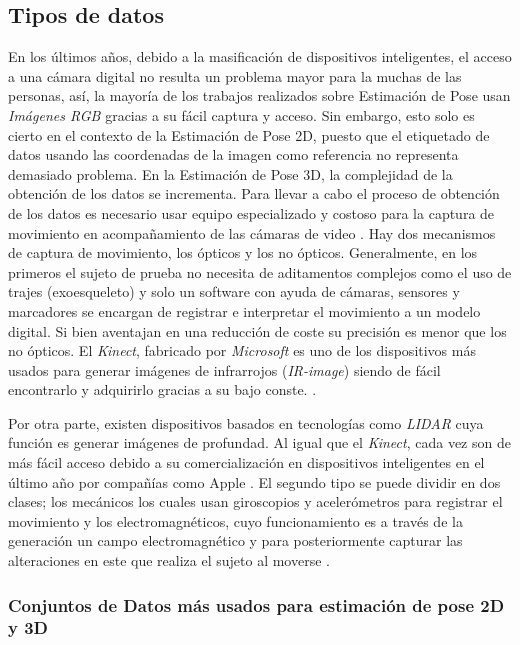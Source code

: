 \subsection{Tipos de datos}

En los últimos años, debido a la masificación
de dispositivos inteligentes, el acceso a una cámara digital no resulta un problema mayor para la muchas
de las personas, así, la mayoría de los trabajos realizados sobre Estimación de Pose usan
\textit{Imágenes RGB} gracias a su fácil captura y acceso.
Sin embargo, esto solo es cierto en el contexto de la Estimación de Pose 2D, puesto que el etiquetado de datos
usando las coordenadas de la imagen como referencia no representa demasiado problema. En la
Estimación de Pose 3D, la complejidad de la obtención de los datos se incrementa. Para llevar a cabo
el proceso de obtención de los datos es necesario usar equipo especializado y costoso para la captura
de movimiento en acompañamiento de las cámaras de video \cite{6682899}. Hay dos mecanismos de captura
de movimiento, los ópticos y los no ópticos. Generalmente, en los primeros el sujeto de prueba no
necesita de aditamentos complejos como el uso de trajes
(exoesqueleto) y solo un software con ayuda de cámaras, sensores y marcadores se
encargan de registrar e interpretar el movimiento a un modelo digital. Si bien
aventajan en una reducción de coste su precisión es menor que los no ópticos.
El \textit{Kinect}, fabricado por \textit{Microsoft} es uno de los dispositivos más usados
para generar imágenes de infrarrojos (\textit{IR-image}) siendo de fácil encontrarlo y adquirirlo
gracias a su bajo conste. \cite{6165146} \cite{Izadi11kinectfusion:real-time}.

Por otra parte, existen dispositivos basados en tecnologías como \textit{LIDAR} cuya función es
generar imágenes de profundad. Al igual que el \textit{Kinect}, cada vez son de más fácil acceso
debido a su comercialización en dispositivos inteligentes en el último año por compañías como Apple
\cite{DBLP:journals/corr/abs-1711-06396}. El segundo tipo se puede dividir en dos clases;
los mecánicos los cuales usan giroscopios y acelerómetros para registrar el
movimiento y los electromagnéticos, cuyo funcionamiento es a través de la generación un campo
electromagnético y para posteriormente capturar las alteraciones en este que realiza el sujeto al
moverse \cite{articleMotion}.

\subsubsection{Conjuntos de Datos más usados para estimación de pose 2D y 3D}

